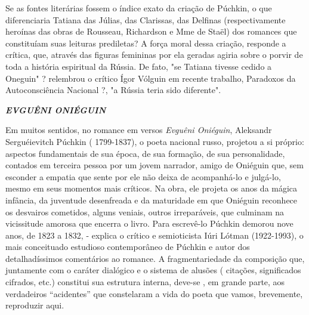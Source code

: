 Se as fontes literárias fossem o índice exato da criação de Púchkin, o
que diferenciaria Tatiana das Júlias, das Clarissas, das Delfinas
(respectivamente heroínas das obras de Rousseau, Richardson e Mme de
Staël) dos romances que constituíam suas leituras prediletas? A força
moral dessa criação, responde a crítica, que, através das figuras
femininas por ela geradas agiria sobre o porvir de toda a história
espiritual da Rússia. De fato, "se Tatiana tivesse cedido a Oneguin" ?
relembrou o crítico Ígor Vólguin em recente trabalho, Paradoxos da
Autoconsciência Nacional ?, "a Rússia teria sido diferente".

\emph{\textbf{EVGUÊNI ONIÉGUIN}}

Em muitos sentidos, no romance em versos \emph{Evguêni Oniéguin},
Aleksandr Serguéievitch Púchkin ( 1799-1837), o poeta nacional russo,
projetou a si próprio: aspectos fundamentais de sua época, de sua
formação, de sua personalidade, contados em terceira pessoa por um jovem
narrador, amigo de Oniéguin que, sem esconder a empatia que sente por
ele não deixa de acompanhá-lo e julgá-lo, mesmo em seus momentos mais
críticos. Na obra, ele projeta os anos da mágica infância, da juventude
desenfreada e da maturidade em que Oniéguin reconhece os desvairos
cometidos, alguns veniais, outros irreparáveis, que culminam na
vicissitude amorosa que encerra o livro. Para escrevê-lo Púchkin demorou
nove anos, de 1823 a 1832, - explica o crítico e semioticista Iúri
Lótman (1922-1993), o mais conceituado estudioso contemporâneo de
Púchkin e autor dos detalhadíssimos comentários ao romance. A
fragmentariedade da composição que, juntamente com o caráter dialógico e
o sistema de alusões ( citações, significados cifrados, etc.) constitui
sua estrutura interna, deve-se , em grande parte, aos verdadeiros
``acidentes'' que constelaram a vida do poeta que vamos, brevemente,
reproduzir aqui.

